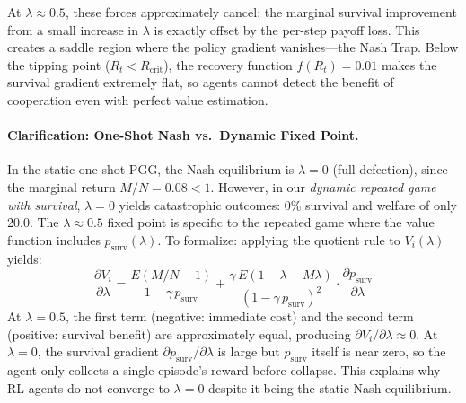 \documentclass{article}
\begin{document}
At $\lambda \approx 0.5$, these forces approximately cancel: the marginal survival improvement from a small increase in $\lambda$ is exactly offset by the per-step payoff loss. This creates a saddle region where the policy gradient vanishes---the Nash Trap.
Below the tipping point ($R_t < R_{\text{crit}}$), the recovery function $f(R_t) = 0.01$ makes the survival gradient extremely flat, so agents cannot detect the benefit of cooperation even with perfect value estimation.

\paragraph{Clarification: One-Shot Nash vs.\ Dynamic Fixed Point.}
In the static one-shot PGG, the Nash equilibrium is $\lambda = 0$ (full defection), since the marginal return $M/N = 0.08 < 1$.
However, in our \emph{dynamic repeated game with survival}, $\lambda = 0$ yields catastrophic outcomes: 0\% survival and welfare of only 20.0.
The $\lambda \approx 0.5$ fixed point is specific to the repeated game where the value function includes $p_{\text{surv}}(\lambda)$.
To formalize: applying the quotient rule to $V_i(\lambda)$ yields:
\begin{equation}
\frac{\partial V_i}{\partial \lambda} = \frac{E(M/N - 1)}{1 - \gamma\, p_{\text{surv}}} + \frac{\gamma\, E(1 - \lambda + M\lambda)}{(1 - \gamma\, p_{\text{surv}})^2} \cdot \frac{\partial p_{\text{surv}}}{\partial \lambda}
\end{equation}
At $\lambda = 0.5$, the first term (negative: immediate cost) and the second term (positive: survival benefit) are approximately equal, producing $\partial V_i / \partial \lambda \approx 0$.
At $\lambda = 0$, the survival gradient $\partial p_{\text{surv}}/\partial \lambda$ is large but $p_{\text{surv}}$ itself is near zero, so the agent only collects a single episode's reward before collapse.
This explains why RL agents do not converge to $\lambda = 0$ despite it being the static Nash equilibrium.
\end{document}
